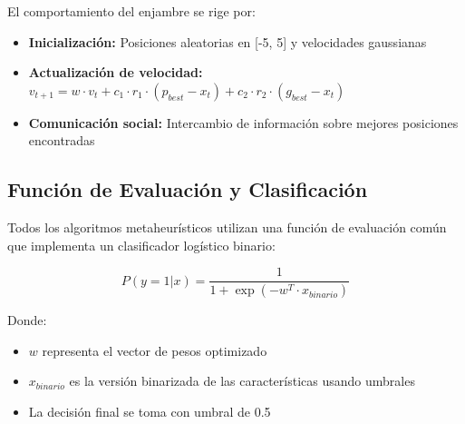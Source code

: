 \begin{table}[htbp]
\centering
{}
\caption{Configuración de parámetros del algoritmo PSO.}
\label{tab:parametros_pso}
\end{table}

El comportamiento del enjambre se rige por:
\begin{itemize}
    \item \textbf{Inicialización:} Posiciones aleatorias en [-5, 5] y velocidades gaussianas
    \item \textbf{Actualización de velocidad:} $v_{t+1} = w \cdot v_t + c_1 \cdot r_1 \cdot (p_{best} - x_t) + c_2 \cdot r_2 \cdot (g_{best} - x_t)$
    \item \textbf{Comunicación social:} Intercambio de información sobre mejores posiciones encontradas
\end{itemize}

\subsection{Función de Evaluación y Clasificación}

Todos los algoritmos metaheurísticos utilizan una función de evaluación común que implementa un clasificador logístico binario:

\begin{equation}
P(y=1|x) = \frac{1}{1 + \exp(-w^T \cdot x_{binario})}
\end{equation}

Donde:
\begin{itemize}
    \item $w$ representa el vector de pesos optimizado
    \item $x_{binario}$ es la versión binarizada de las características usando umbrales
    \item La decisión final se toma con umbral de 0.5
\end{itemize}


